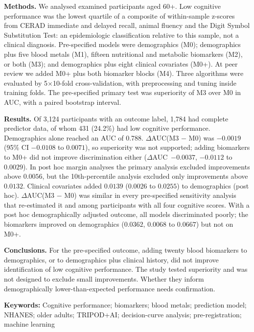 \documentclass[12pt]{article}
\newcommand{\deltaauc}{$\Delta$AUC}
\begin{document}
\textbf{Methods.} We analysed examined participants aged 60+. Low cognitive performance was the lowest quartile of a composite of within-sample z-scores from CERAD immediate and delayed recall, animal fluency and the Digit Symbol Substitution Test: an epidemiologic classification relative to this sample, not a clinical diagnosis. Pre-specified models were demographics (M0); demographics plus five blood metals (M1), fifteen nutritional and metabolic biomarkers (M2), or both (M3); and demographics plus eight clinical covariates (M0+). At peer review we added M0+ plus both biomarker blocks (M4). Three algorithms were evaluated by 5$\times$10-fold cross-validation, with preprocessing and tuning inside training folds. The pre-specified primary test was superiority of M3 over M0 in AUC, with a paired bootstrap interval.

\textbf{Results.} Of 3,124 participants with an outcome label, 1,784 had complete predictor data, of whom 431 (24.2\%) had low cognitive performance. Demographics alone reached an AUC of 0.788. \deltaauc(M3 $-$ M0) was $-0.0019$ (95\% CI $-0.0108$ to $0.0071$), so superiority was not supported; adding biomarkers to M0+ did not improve discrimination either (\deltaauc\ $-0.0037$, $-0.0112$ to $0.0029$). In post hoc margin analyses the primary analysis excluded improvements above $0.0056$, but the 10th-percentile analysis excluded only improvements above $0.0132$. Clinical covariates added $0.0139$ ($0.0026$ to $0.0255$) to demographics (post hoc). \deltaauc(M3 $-$ M0) was similar in every pre-specified sensitivity analysis that re-estimated it and among participants with all four cognitive scores. With a post hoc demographically adjusted outcome, all models discriminated poorly; the biomarkers improved on demographics ($0.0362$, $0.0068$ to $0.0667$) but not on M0+.

\textbf{Conclusions.} For the pre-specified outcome, adding twenty blood biomarkers to demographics, or to demographics plus clinical history, did not improve identification of low cognitive performance. The study tested superiority and was not designed to exclude small improvements. Whether they inform demographically lower-than-expected performance needs confirmation.

\medskip
\noindent\textbf{Keywords:} Cognitive performance; biomarkers; blood metals; prediction model; NHANES; older adults; TRIPOD+AI; decision-curve analysis; pre-registration; machine learning

\clearpage

\end{document}
